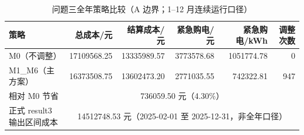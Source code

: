 \begin{table}[htbp]
\centering
\caption{问题三全年策略比较（A 边界；1--12 月连续运行口径）}\label{tab:q3-strategy-compare}
\normalsize\setlength{\tabcolsep}{5pt}
\begin{tabular}{@{}lrrrrr@{}}
\toprule
策略 & 总成本/元 & 结算成本/元 & 紧急购电/元 & 紧急购电/kWh & 调整次数 \\
\midrule
M0（不调整） & 17109568.25 & 13335989.57 & 3773578.68 & 1051774.78 & 0 \\
M1\_M6（主方案） & 16373508.75 & 13602473.20 & 2771035.55 & 742322.81 & 947 \\
\midrule
相对 M0 节省 & \multicolumn{5}{c}{736059.50 元（4.30\%）} \\
正式 result3 输出区间成本 & \multicolumn{5}{c}{14512748.53 元（2025-02-01 至 2025-12-31，非全年口径）} \\
\bottomrule
\end{tabular}
\end{table}

